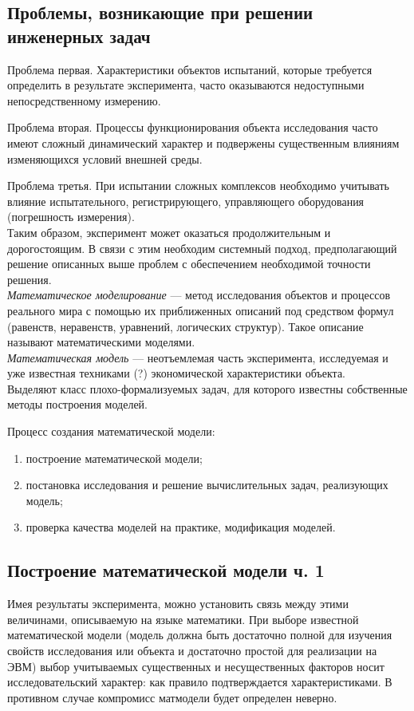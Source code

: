 \documentclass[12pt]{article}
\begin{document}
\subsection{Проблемы, возникающие при решении инженерных задач}
Проблема первая. Характеристики объектов испытаний, которые требуется определить в результате эксперимента, часто оказываются недоступными непосредственному измерению.

Проблема вторая. Процессы функционирования объекта исследования часто имеют сложный динамический характер и подвержены существенным влияниям изменяющихся условий внешней среды.

Проблема третья. При испытании сложных комплексов необходимо учитывать влияние испытательного, регистрирующего, управляющего оборудования (погрешность измерения).\\

Таким образом, эксперимент может оказаться продолжительным и дорогостоящим. В связи с этим необходим системный подход, предполагающий решение описанных выше проблем с обеспечением необходимой точности решения.\\

\emph{Математическое моделирование} --- метод исследования объектов и процессов реального мира с помощью их приближенных описаний под средством формул (равенств, неравенств, уравнений, логических структур). Такое описание называют математическими моделями.\\

\emph{Математическая модель} --- неотъемлемая часть эксперимента, исследуемая и уже известная техниками (?)  экономической характеристики объекта.\\

Выделяют класс плохо-формализуемых задач, для которого известны собственные методы построения моделей.

Процесс создания математической модели:
\begin{enumerate}
    \item построение математической модели;
    \item постановка исследования и решение вычислительных задач, реализующих модель;
    \item проверка качества моделей на практике, модификация моделей.
\end{enumerate}

\subsection{Построение математической модели ч. 1}
Имея результаты эксперимента, можно установить связь между этими величинами, описываемую на языке математики. При выборе известной математической модели (модель должна быть достаточно полной для изучения свойств исследования или объекта и достаточно простой для реализации на ЭВМ) выбор учитываемых существенных и несущественных факторов носит исследовательский характер: как правило подтверждается характеристиками. В противном случае компромисс матмодели будет определен неверно.
\end{document}
